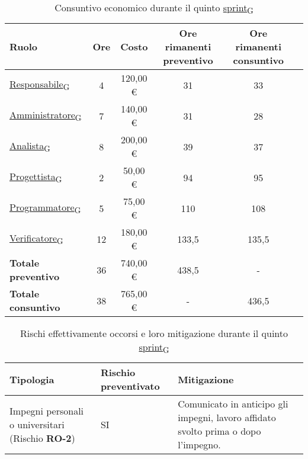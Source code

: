  \begin{table}[!h]
     \centering
     \begin{tabular}{ | l | c | c | c | c | c | }
         \hline
         \textbf{Ruolo} & \textbf{Ore} & \textbf{Costo} & \textbf{Ore rimanenti preventivo} & \textbf{Ore rimanenti consuntivo} \\
         \hline
         \href{https://7last.github.io/docs/rtb/documentazione-interna/glossario\#responsabile}{Responsabile\textsubscript{G}}               &  4   &    120,00 € &   31   &   33   \\
         \href{https://7last.github.io/docs/rtb/documentazione-interna/glossario\#amministratore}{Amministratore\textsubscript{G}}             &  7   &    140,00 € &   31   &   28   \\
         \href{https://7last.github.io/docs/rtb/documentazione-interna/glossario\#analista}{Analista\textsubscript{G}}                   &  8   &    200,00 € &   39   &   37   \\
         \href{https://7last.github.io/docs/rtb/documentazione-interna/glossario\#progettista}{Progettista\textsubscript{G}}                &  2   &    50,00 € &   94   &   95   \\
         \href{https://7last.github.io/docs/rtb/documentazione-interna/glossario\#programmatore}{Programmatore\textsubscript{G}}              &  5   &    75,00 € &   110   &   108   \\
         \href{https://7last.github.io/docs/rtb/documentazione-interna/glossario\#verificatore}{Verificatore\textsubscript{G}}               &  12   &    180,00 € &   133,5   &   135,5   \\
         \hline
         \textbf{Totale preventivo} &  36   &    740,00 € &   438,5   &   -   \\
         \hline
         \textbf{Totale consuntivo} &  38   &    765,00 € &   -   &   436,5   \\
         \hline
     \end{tabular}
     \caption{Consuntivo economico durante il quinto \href{https://7last.github.io/docs/rtb/documentazione-interna/glossario\#sprint}{sprint\textsubscript{G}}}
 \end{table}
\newpage
 \begin{table}[!h]
     \centering
     \begin{tabular}{ | p{6cm} | p{2.5cm} | p{7.5cm} | }
         \hline
         \textbf{Tipologia} & \textbf{Rischio preventivato} & \textbf{Mitigazione}  \\
         \hline
         Impegni personali o universitari (Rischio \textbf{RO-2})& SI & Comunicato in anticipo gli impegni, lavoro affidato svolto prima o dopo l'impegno.\\
         \hline
     \end{tabular}
     \caption{Rischi effettivamente occorsi e loro mitigazione durante il quinto \href{https://7last.github.io/docs/rtb/documentazione-interna/glossario\#sprint}{sprint\textsubscript{G}}}

 \end{table}

